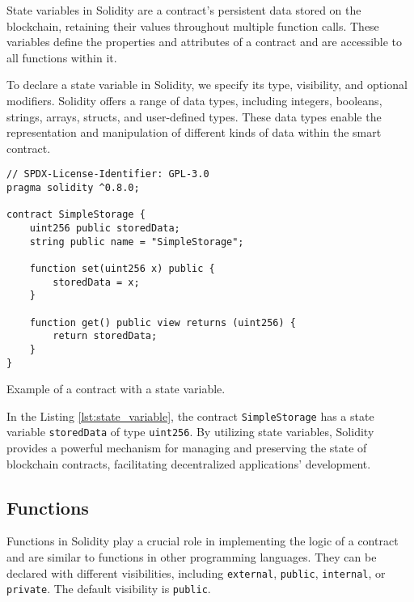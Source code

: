 State variables in Solidity are a contract's persistent data stored on the blockchain, retaining their values throughout multiple function calls. These 
variables define the properties and attributes of a contract and are accessible to all functions within it.

To declare a state variable in Solidity, we specify its type, visibility, and optional modifiers. Solidity offers a range of data types, including integers, booleans, 
strings, arrays, structs, and user-defined types. These data types enable the representation and manipulation of different kinds of data within the smart contract.

\begin{listing}[H]
    \begin{verbatim}
// SPDX-License-Identifier: GPL-3.0
pragma solidity ^0.8.0;

contract SimpleStorage {
    uint256 public storedData;
    string public name = "SimpleStorage";

    function set(uint256 x) public {
        storedData = x;
    }

    function get() public view returns (uint256) {
        return storedData;
    }
}
    \end{verbatim}
    \caption{Example of a contract with a state variable.}
    \label{lst:state_variable}
\end{listing}

In the Listing \ref{lst:state_variable}, the contract \texttt{SimpleStorage} has a state variable \texttt{storedData} of type \texttt{uint256}.
By utilizing state variables, Solidity provides a powerful mechanism for managing and preserving the state of blockchain contracts, facilitating decentralized applications' development.


\subsection{Functions}

Functions in Solidity play a crucial role in implementing the logic of a contract and are similar to functions in other programming languages. They can 
be declared with different visibilities, including \texttt{external}, \texttt{public}, \texttt{internal}, or \texttt{private}. The default visibility is \texttt{public}.


